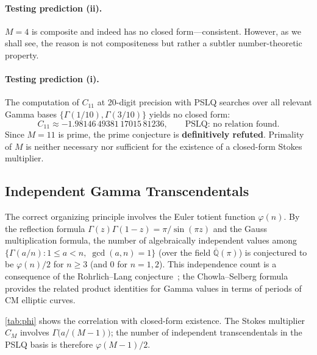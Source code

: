 \documentclass[12pt,a4paper]{article}
\numberwithin{equation}{section}
\theoremstyle{plain}
\theoremstyle{definition}
\theoremstyle{remark}
\begin{document}
\paragraph{Testing prediction (ii).}
$M = 4$ is composite and indeed has no closed form---consistent. However,
as we shall see, the reason is not compositeness but rather a subtler
number-theoretic property.

\paragraph{Testing prediction (i).}
The computation of $C_{11}$ at 20-digit precision with PSLQ searches
over all relevant Gamma bases
$\{\Gamma(1/10), \Gamma(3/10)\}$ yields no closed form:
\begin{equation}\label{eq:C11-value}
  C_{11} \approx -1.98146\,49381\,17015\,81236,
  \qquad \text{PSLQ: no relation found.}
\end{equation}
Since $M = 11$ is prime, the prime conjecture is \textbf{definitively
refuted}. Primality of $M$ is neither necessary nor sufficient for the
existence of a closed-form Stokes multiplier.

\subsection{Independent Gamma Transcendentals}
\label{sec:gamma-independence}

The correct organizing principle involves the Euler totient function
$\varphi(n)$. By the reflection formula
$\Gamma(z)\Gamma(1-z) = \pi/\sin(\pi z)$
and the Gauss multiplication formula, the number of algebraically
independent values among
$\{\Gamma(a/n) : 1 \le a < n,\; \gcd(a,n) = 1\}$
(over the field $\overline{\mathbb{Q}}(\pi)$) is conjectured to be
$\varphi(n)/2$ for $n \ge 3$ (and $0$ for $n = 1, 2$). This independence
count is a consequence of the Rohrlich--Lang
conjecture~\cite{Waldschmidt,RohrlichLang}; the Chowla--Selberg
formula~\cite{ChowlaSelberg} provides the related product identities
for Gamma values in terms of periods of CM elliptic curves.

\cref{tab:phi} shows the correlation with closed-form existence.
The Stokes multiplier $C_M$ involves
$\Gamma\bigl(a/(M{-}1)\bigr)$; the number of independent transcendentals
in the PSLQ basis is therefore $\varphi(M{-}1)/2$.
\end{document}
